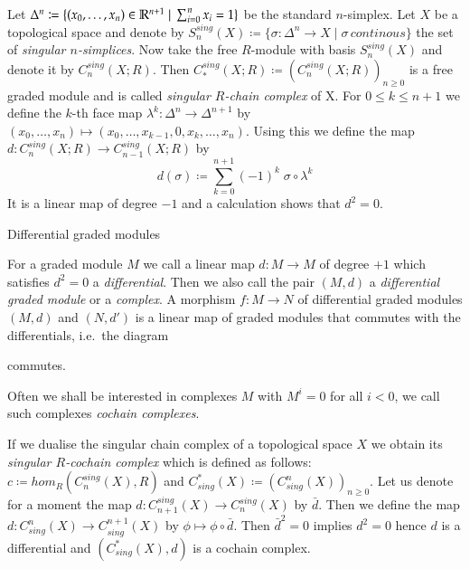 \begin{Example}
\label{ex:SingularChainComplex}
 Let $\Delta^n \coloneqq {\lbrace (x_0, \dotsc , x_n) \in \mathbb{R}^{n+1} \; | \; \sum_{i = 0}^n x_i = 1\rbrace}$ be the standard
 $n$-simplex. Let $X$ be a topological space and denote by
 $S_n^{sing}(X) \coloneqq {\lbrace \sigma \colon \Delta^n \to X \; | \; \sigma \, continous \rbrace}$ the set of
 \emph{singular $n$-simplices}. 
 Now take the free $R$-module with basis $S_n^{sing}(X)$ 
 and denote it by $C_n^{sing}(X;R)$.
 Then $ C_*^{sing}(X;R) \coloneqq (C_n^{sing}(X;R))_{n \geq 0}$ is a free graded module and is called 
 \emph{singular $R$-chain complex} of X. \newline
 For $0 \leq k \leq n+1$ we define the $k$-th face map $\lambda^k \colon \Delta^{n} \to \Delta^{n+1}$ by
 $(x_0, \dotsc, x_n) \mapsto (x_0, \dotsc, x_{k-1},0, x_k, \dotsc, x_n)$.
 Using this we define the map $d \colon C_n^{sing}(X;R) \to C_{n-1}^{sing}(X;R)$ by
 $$ d(\sigma) \coloneqq \sum_{k = 0}^{n+1} (-1)^k \; \sigma \circ \lambda^k$$
 It is a linear map of degree $-1$ and a calculation shows that $d^2 = 0$.
 \end{Example}

\begin{Definition}{Differential graded modules}

For a graded module $M$ we call a linear map $d \colon M \to M$ of degree $+1$ which satisfies $ d^2 = 0$ a \emph{differential}.
Then we also call the pair $(M , d)$ a \emph{differential graded module} or a \emph{complex}.
A morphism $f \colon M \to N$ of differential graded modules $(M,d)$ and $(N,d')$ is a linear map of graded modules that commutes with the 
differentials, i.e.\ the diagram \\

\centerline{
}
commutes.
\end{Definition}

Often we shall be interested in complexes $M$ with $M^i = 0$ for all $i < 0$, we call such complexes \emph{cochain complexes}.

\begin{Example}
 If we dualise the singular chain complex of a topological space $X$ we obtain its \emph{singular $R$-cochain complex} which 
 is defined as follows: \newline
 $c \coloneqq hom_R(C_n^{sing}(X),R)$ and $C^*_{sing}(X) \coloneqq (C^n_{sing}(X))_{n \geq 0}$. \newline
 Let us denote for a moment the map $d \colon C_{n+1}^{sing}(X) \to C_n^{sing}(X)$ by $\bar{d}$. Then we define the map
 $d \colon C_{sing}^n(X) \to C_{sing}^{n+1}(X)$ by $\phi \mapsto \phi \circ \bar{d}$. Then $\bar{d}^2 = 0$ implies $d^2 = 0$
 hence $d$ is a differential and $(C^*_{sing}(X),d)$ is a cochain complex.
\end{Example}


